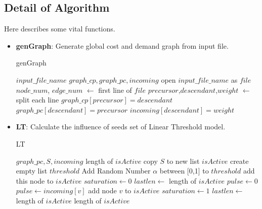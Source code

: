\documentclass[conference,compsoc]{IEEEtran}
\renewcommand{\algorithmicrequire}{\textbf{Input:}}
\renewcommand{\algorithmicensure}{\textbf{Output:}}
\begin{document}
\subsection{Detail of Algorithm}
Here describes some vital functions.
\begin{itemize}
    \item \textbf{genGraph}: Generate global cost and demand graph from
    input file.
    \begin{algorithm}[H]
     \caption{genGraph}
     \begin{algorithmic}[1]
     \renewcommand{\algorithmicrequire}{\textbf{Input:}}
     \renewcommand{\algorithmicensure}{\textbf{Output:}}
     \REQUIRE $input\_file\_name$
     \ENSURE $graph\_cp, graph\_pc, incoming$
     \STATE open $input\_file\_name$ as $file$ 
     \STATE $node\_num$, $edge\_num$ $\leftarrow$ first line of $file$
     \STATE {}
       \STATE $precursor$,$descendant$,$weight$ $\leftarrow$ split each line
          \STATE $graph\_cp[precursor] = descendant$
	  \STATE $graph\_pc[descendant] = precursor$
	  \STATE $incoming[descendant] = weight$
     \ENDFOR
     \end{algorithmic}
   \end{algorithm}

   \item \textbf{LT}: Calculate the influence of seeds set of Linear Threshold
	   model.
     \begin{algorithm}[H]
     \caption{LT}
     \begin{algorithmic}[2]
     \renewcommand{\algorithmicrequire}{\textbf{Input:}}
     \renewcommand{\algorithmicensure}{\textbf{Output:}}
     \REQUIRE $graph\_pc, S, incoming$
     \ENSURE  length of $isActive$
     \STATE copy $S$ to new list $isActive$
     \STATE create empty list $threshold$
	\STATE Add Random Number $\alpha$ between [0,1] to $threshold$
	     \STATE add this node to $isActive$
	\ENDIF
     \ENDFOR
     \STATE $saturation \leftarrow 0$ 
     \STATE $lastlen \leftarrow $ length of $isActive$ 
	\STATE $pulse \leftarrow 0$
	     \STATE $pulse \leftarrow incoming[v]$
        \ENDFOR
            \STATE add node $v$ to $isActive$
	\ENDIF
	     \STATE $saturation \leftarrow 1$ 
	\ENDIF
	\STATE $lastlen \leftarrow$ length of $isActive$
     \ENDWHILE
     \RETURN length of $isActive$
     \end{algorithmic}
     \end{algorithm}


\end{itemize}
\end{document}
